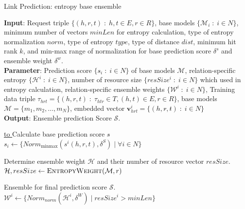 \documentclass{article}
\begin{document}



\begin{algorithm}[!htb]
    \caption{Link Prediction: entropy base ensemble}
    \label{alg:linkPredictOverview}
    \textbf{Input}: Request triple $\{(h, r, t) \;:\; h,t \in E, r \in R\}$, base models $\{\mathcal{M}_i \;:\; i \in N\}$, minimum number of vectors $minLen$ for entropy calculation, type of entropy normalization $norm$, type of entropy $\mathit{type}$, type of distance $\mathit{dist}$, minimum hit rank $k$, and min-max range of normalization for base prediction score $\delta^{s}$ and ensemble weight $\delta^{w}$.\\
    \textbf{Parameter}: Prediction score $\{s\acute{}_{i} \;:\; i \in N\}$ of base models $\mathcal{M}$, relation-specific entropy $\{\mathcal{H}^{i} \;:\; i \in N\}$, number of resource size $\{resSize^{i} \;:\; i \in N\}$ which used in entropy calculation, relation-specific ensemble weights $\{\mathcal{W}^i \;:\; i \in N\}$, Training data triple $\tau_{hrt} = \{(h, r, t)\;:\; \tau_{htr} \in T, (h, t) \in E, r \in R \}$, base models $\mathcal{M} = \{m_1, m_2, \ldots, m_N\}$, embedded vector $\mathbf{v}_{hrt}^i = \{(h\acute{}, r\acute{}, t\acute{})\;:\; i \in {N}\}$\\
    \textbf{Output}: Ensemble prediction Score $\mathcal{S}$.\\
    
    \begin{algorithmic}[1] %
    
        \Statex \hrulefill
        \Statex \noindent\underline{\hbox to }
        \Statex Calculate base prediction score $s\acute{}$
        \State $s\acute{}_i \leftarrow \{Norm_{\text{minmax}}(s^i(h, r, t), \delta^{S}) \;|\; \forall i \in N\}$
        
        \Statex
    
        \Statex Determine ensemble weight $\mathcal{H}$ and their number of resource vector $resSize$.
        \vspace{3pt}
        \State $\mathcal{H}, resSize \leftarrow \Call{EntropyWeight}{\mathcal{M}, r}$
        \Statex

        \Statex Ensemble for final prediction score $\mathcal{S}$.
        \vspace{3pt}
        \State $\mathcal{W}^i \leftarrow \{Norm_{norm}(\mathcal{H}^i, \delta^{W}) \;|\; resSize^{i}>minLen\}$
        \vspace{3pt}


\end{algorithmic}
\end{algorithm}
\end{document}
